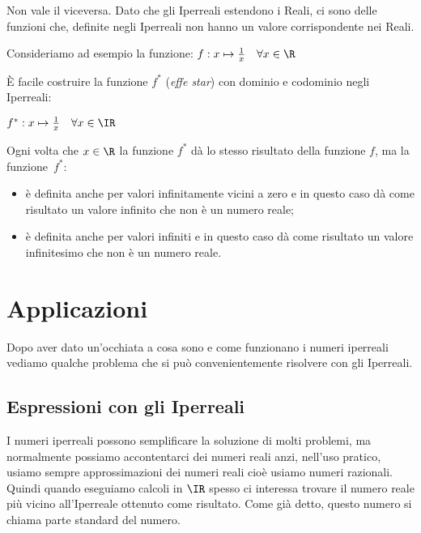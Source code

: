 \begin{osservazione}
 Non vale il viceversa. Dato che gli Iperreali estendono i Reali, ci sono delle 
funzioni che, definite negli Iperreali non hanno un valore corrispondente nei 
Reali.

\begin{esempio}
 Consideriamo ad esempio la funzione: 
$f: x \mapsto \frac{1}{x} \quad \forall x \in \R$

È facile costruire la funzione $f^*$ (\emph{effe star}) con dominio e codominio 
negli Iperreali:

$f^*: x \mapsto \frac{1}{x} \quad \forall x \in \IR$

Ogni volta che $x \in \R$ la funzione $f^*$ dà lo stesso risultato della 
funzione $f$, ma la funzione~$f^*$:
\begin{itemize} [noitemsep]
 \item 
è definita anche per valori infinitamente vicini a zero e 
in questo caso dà come risultato un valore infinito che non è un numero reale;
 \item 
è definita anche per valori infiniti e
in questo caso dà come risultato un valore infinitesimo che non è un numero 
reale. 
\end{itemize}
\end{esempio}
\end{osservazione}

\section{Applicazioni}
\label{sec:insnum_applicazioni}

Dopo aver dato un'occhiata a cosa sono e come funzionano i numeri iperreali 
vediamo qualche problema che si può convenientemente risolvere con gli 
Iperreali.

\subsection{Espressioni con gli Iperreali}
\label{subsec:insnum_espressioni}

I numeri iperreali possono semplificare la soluzione di molti problemi, 
ma normalmente possiamo accontentarci dei numeri reali anzi, nell'uso pratico, 
usiamo sempre approssimazioni dei numeri reali cioè usiamo numeri razionali. 
Quindi quando eseguiamo calcoli in \(\IR\) spesso ci interessa trovare il 
numero reale più vicino all'Iperreale ottenuto come risultato. Come già detto, 
questo numero si chiama parte standard del numero.

